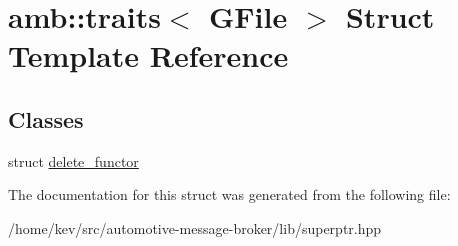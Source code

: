 \hypertarget{structamb_1_1traits_3_01GFile_01_4}{\section{amb\+:\+:traits$<$ G\+File $>$ Struct Template Reference}
\label{structamb_1_1traits_3_01GFile_01_4}
}
\subsection*{Classes}
\begin{DoxyCompactItemize}
\item 
struct \hyperlink{structamb_1_1traits_3_01GFile_01_4_1_1delete__functor}{delete\+\_\+functor}
\end{DoxyCompactItemize}


The documentation for this struct was generated from the following file\+:\begin{DoxyCompactItemize}
\item 
/home/kev/src/automotive-\/message-\/broker/lib/superptr.\+hpp\end{DoxyCompactItemize}
